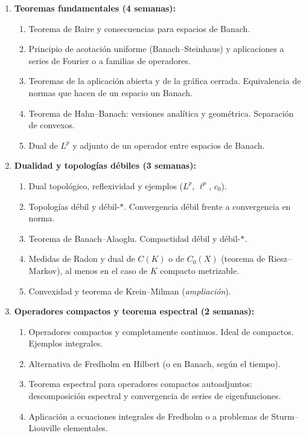 \begin{refsection}
\begin{enumerate}
\item \textbf{Teoremas fundamentales (4 semanas):}
\begin{enumerate}
    \item Teorema de Baire y consecuencias para espacios de Banach.
    \item Principio de acotación uniforme (Banach--Steinhaus) y aplicaciones a series de Fourier o a familias de operadores.
    \item Teoremas de la aplicación abierta y de la gráfica cerrada. Equivalencia de normas que hacen de un espacio un Banach.
    \item Teorema de Hahn--Banach: versiones analítica y geométrica. Separación de convexos.
    \item Dual de $L^p$ y adjunto de un operador entre espacios de Banach.
\end{enumerate}

\item \textbf{Dualidad y topologías débiles (3 semanas):}
\begin{enumerate}
    \item Dual topológico, reflexividad y ejemplos ($L^p$, $\ell^p$, $c_0$).
    \item Topologías débil y débil-$*$. Convergencia débil frente a convergencia en norma.
    \item Teorema de Banach--Alaoglu. Compactidad débil y débil-$*$.
    \item Medidas de Radon y dual de $C(K)$ o de $C_0(X)$ (teorema de Riesz--Markov), al menos en el caso de $K$ compacto metrizable.
    \item Convexidad y teorema de Krein--Milman (\emph{ampliación}).
\end{enumerate}

\item \textbf{Operadores compactos y teorema espectral (2 semanas):}
\begin{enumerate}
    \item Operadores compactos y completamente continuos. Ideal de compactos. Ejemplos integrales.
    \item Alternativa de Fredholm en Hilbert (o en Banach, según el tiempo).
    \item Teorema espectral para operadores compactos autoadjuntos: descomposición espectral y convergencia de series de eigenfunciones.
    \item Aplicación a ecuaciones integrales de Fredholm o a problemas de Sturm--Liouville elementales.
\end{enumerate}


\end{enumerate}
\end{refsection}

